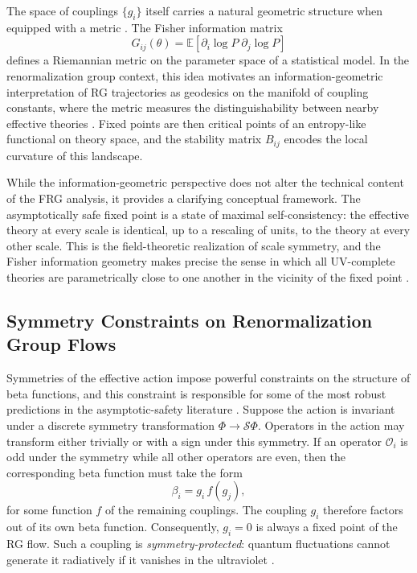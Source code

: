 \documentclass[12pt,a4paper]{article}
\begin{document}
The space of couplings $\{g_i\}$ itself carries a natural geometric structure
when equipped with a metric \cite{Fisher1922,AmariNagaoka2000,Amari2016}.
The Fisher information matrix
\begin{equation}
G_{ij}(\theta) = \mathbb{E}\!\left[\partial_i \log P\;\partial_j \log P\right]
\end{equation}
defines a Riemannian metric on the parameter space of a statistical model.
In the renormalization group context, this idea motivates an information-geometric
interpretation of RG trajectories as geodesics on the manifold of coupling
constants, where the metric measures the distinguishability between nearby
effective theories \cite{Ruppeiner1995}. Fixed points are then critical points
of an entropy-like functional on theory space, and the stability matrix
$B_{ij}$ encodes the local curvature of this landscape.

While the information-geometric perspective does not alter the technical content
of the FRG analysis, it provides a clarifying conceptual framework. The
asymptotically safe fixed point is a state of maximal self-consistency: the
effective theory at every scale is identical, up to a rescaling of units, to
the theory at every other scale. This is the field-theoretic realization of
scale symmetry, and the Fisher information geometry makes precise the sense in
which all UV-complete theories are parametrically close to one another in the
vicinity of the fixed point \cite{Amari2016}.

\subsection{Symmetry Constraints on Renormalization Group Flows}

Symmetries of the effective action impose powerful constraints on the structure
of beta functions, and this constraint is responsible for some of the most
robust predictions in the asymptotic-safety literature \cite{Eichhorn2019}.
Suppose the action is invariant under a discrete symmetry transformation
$\Phi \to \mathcal{S}\Phi$. Operators in the action may transform either
trivially or with a sign under this symmetry. If an operator $\mathcal{O}_i$
is odd under the symmetry while all other operators are even, then the
corresponding beta function must take the form
\begin{equation}
\beta_i = g_i\,f(g_j),
\end{equation}
for some function $f$ of the remaining couplings. The coupling $g_i$ therefore
factors out of its own beta function. Consequently, $g_i = 0$ is always a
fixed point of the RG flow. Such a coupling is \emph{symmetry-protected}:
quantum fluctuations cannot generate it radiatively if it vanishes in the
ultraviolet \cite{EichhornLinoWagner2023}.
\end{document}
